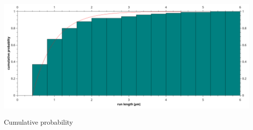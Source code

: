     	 \minipanf
    	                \begin{center}
    	                \includegraphics[scale=0.3]{pic/cumulative_runlength.png}
    	                \caption{Cumulative probability}
    	                \end{center}
    	 \minipend
    	